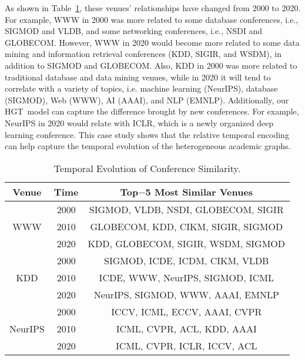 \documentclass[sigconf]{acmart}
\theoremstyle{definition}
\newcommand{\short}{HGT}
\begin{document}
As shown in Table~\ref{tab:case}, these venues' relationships have changed from 2000 to 2020. 
For example, WWW in 2000 was more related to some database conferences, i.e., SIGMOD and VLDB, and some networking conferences, i.e., NSDI and GLOBECOM. 
However,  WWW in 2020 would become more related to some data mining and information retrieval conferences (KDD, SIGIR, and WSDM), in addition to SIGMOD and GLOBECOM. 
Also, KDD in 2000 was more related to traditional database and data mining venues, while in 2020 it will tend to correlate with a variety of topics, i.e. machine learning (NeurIPS), database (SIGMOD), Web (WWW), AI (AAAI), and NLP (EMNLP). 
Additionally, our \short\ model can capture the difference brought by new conferences. 
For example, NeurIPS in 2020 would relate with ICLR, which is a newly organized deep learning conference. 
This case study shows that the relative temporal encoding can help capture the temporal evolution of the heterogeneous academic graphs.

\begin{table}[t!]
\centering
\renewcommand\arraystretch{1.3}
\begin{tabular}{ccc} 
\toprule
Venue & Time & Top$-$5 Most Similar Venues \\
\midrule
\multirow{3}{*}{WWW} & 2000 & SIGMOD, VLDB, NSDI, GLOBECOM, SIGIR\\
~& 2010 & GLOBECOM, KDD, CIKM, SIGIR, SIGMOD\\
~& 2020 & KDD, GLOBECOM, SIGIR, WSDM, SIGMOD\\
\midrule
\multirow{3}{*}{KDD} & 2000 & SIGMOD, ICDE, ICDM, CIKM, VLDB\\
~& 2010 & ICDE, WWW, NeurIPS, SIGMOD, ICML\\
~& 2020 & NeurIPS, SIGMOD, WWW, AAAI, EMNLP\\
\midrule
\multirow{3}{*}{NeurIPS} & 2000 & ICCV, ICML, ECCV, AAAI, CVPR\\
~& 2010 & ICML, CVPR, ACL, KDD, AAAI\\
~& 2020 & ICML, CVPR, ICLR, ICCV, ACL\\
\bottomrule
\end{tabular}
\caption{Temporal Evolution of Conference Similarity.} 
\label{tab:case} 
\end{table}
\end{document}
